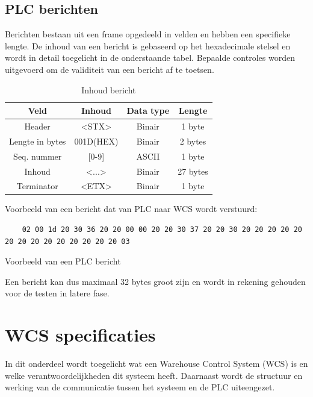 \subsection{PLC berichten}
Berichten bestaan uit een frame opgedeeld in velden en hebben een specifieke lengte.
De inhoud van een bericht is gebaseerd op het hexadecimale stelsel en wordt in detail toegelicht in de onderstaande tabel.
Bepaalde controles worden uitgevoerd om de validiteit van een bericht af te toetsen. 

\begin{table}[h!]
  \centering 
  \begin{tabular}{|c|c|c|c|}
    \hline
    \textbf{Veld} & \textbf{Inhoud} & \textbf{Data type} & \textbf{Lengte} \\
    \hline 
    Header & <STX> & Binair & 1 byte \\
    \hline 
    Lengte in bytes & 001D(HEX) & Binair & 2 bytes \\
    \hline 
    Seq. nummer &  [0-9] & ASCII & 1 byte  \\
    \hline 
    Inhoud & <...> & Binair & 27 bytes \\
    \hline 
    Terminator & <ETX> & Binair & 1 byte \\
    \hline
  \end{tabular}
  \caption[Message content]{\label{tab:message-content}Inhoud bericht}
\end{table}

Voorbeeld van een bericht dat van PLC naar WCS wordt verstuurd: 
\begin{listing}[h!]
  \begin{verbatim}
    02 00 1d 20 30 36 20 20 00 00 20 20 30 37 20 20 30 20 20 20 20 20 20 20 20 20 20 20 20 20 20 03
  \end{verbatim}
  \caption[Voorbeeld PLC bericht]{Voorbeeld van een PLC bericht}
\end{listing}

Een bericht kan dus maximaal 32 bytes groot zijn en wordt in rekening gehouden voor de testen in latere fase.

\section{WCS specificaties}
In dit onderdeel wordt toegelicht wat een Warehouse Control System (WCS) is en welke verantwoordelijkheden dit systeem heeft.
Daarnaast wordt de structuur en werking van de communicatie tussen het systeem en de PLC uiteengezet.

